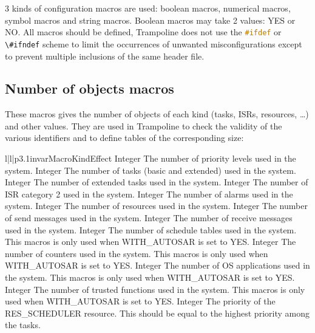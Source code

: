 3 kinds of configuration macros are used: boolean macros, numerical macros, symbol macros and string macros. Boolean macros may take 2 values: YES or NO. All macros should be defined, Trampoline does not use the \lstinline[language=C]{#ifdef} or \lstinline[language=C]{\#ifndef} scheme to limit the occurrences of unwanted misconfigurations except to prevent multiple inclusions of the same header file.

\subsection{Number of objects macros}

These macros gives the number of objects of each kind (tasks, ISRs, resources, \ldots) and other values. They are used in Trampoline to check the validity of the various identifiers and to define tables of the corresponding size:
 
\begin{longtableiii}{l|l|p{3.1in}}{var}{Macro}{Kind}{Effect}
  {Integer}
  {The number of priority levels used in the system.}
  {Integer}
  {The number of tasks (basic and extended) used in the system.}
  {Integer}
  {The number of extended tasks used in the system.}
  {Integer}
  {The number of ISR category 2 used in the system.}
  {Integer}
  {The number of alarms used in the system.}
  {Integer}
  {The number of resources used in the system.}
  {Integer}
  {The number of send messages used in the system.}
  {Integer}
  {The number of receive messages used in the system.}
  {Integer}
  {The number of schedule tables used in the system. This macros is only used when WITH_AUTOSAR is set to YES.}
  {Integer}
  {The number of counters used in the system. This macros is only used when WITH_AUTOSAR is set to YES.}
  {Integer}
  {The number of OS applications used in the system. This macros is only used when WITH_AUTOSAR is set to YES.}
  {Integer}
  {The number of trusted functions used in the system. This macros is only used when WITH_AUTOSAR is set to YES.}
  {Integer}
  {The priority of the RES_SCHEDULER resource. This should be equal to the highest priority among the tasks.}
\end{longtableiii}

